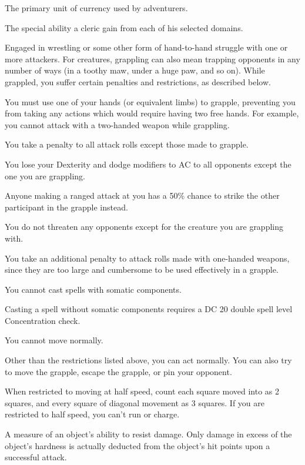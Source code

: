  The primary unit of currency used by adventurers. 

 The special ability a cleric gain from each of his 
selected domains. 

 Engaged in wrestling or some other form of hand-to-hand struggle with one or more attackers. For creatures, grappling can also mean 
trapping opponents in any number of ways (in a toothy maw, under 
a huge paw, and so on). While grappled, you suffer certain penalties and restrictions, as described below.
\begin{itemize*}
\item You must use one of your hands (or equivalent limbs) to grapple, preventing you from taking any actions which would require having two free hands. For example, you cannot attack with a two-handed weapon while grappling.
\item You take a  penalty to all attack rolls except those made to grapple.
\item You lose your Dexterity and dodge modifiers to AC to all opponents except the one you are grappling.
\item Anyone making a ranged attack at you has a 50\% chance to strike the other participant in the grapple instead.
\item You do not threaten any opponents except for the creature you are grappling with.
\item You take an additional  penalty to attack rolls made with one-handed weapons, since they are too large and cumbersome to be used effectively in a grapple.
\item You cannot cast spells with somatic components.
\item Casting a spell without somatic components requires a DC 20 \add double spell level Concentration check.
\item You cannot move normally.
\end{itemize*}
Other than the restrictions listed above, you can act normally. You can also try to move the grapple, escape the grapple, or pin your opponent.

 When restricted to moving at half speed, count each 
square moved into as 2 squares, and every square of diagonal 
movement as 3 squares. If you are restricted to half speed, you can't 
run or charge.

 A measure of an object's ability to resist damage. Only 
damage in excess of the object's hardness is actually deducted from 
the object's hit points upon a successful attack. 

